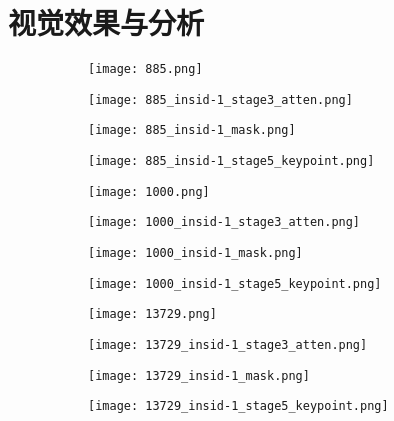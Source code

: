 \section{视觉效果与分析}
\label{sec:demo}

\begin{figure}[htbp]
	\centering
	\begin{minipage}[t]{\linewidth}
		\centering
		\begin{subfigure}[b]{0.23\linewidth}
			\texttt{[image: 885.png]}
		\end{subfigure}
		\begin{subfigure}[b]{0.23\linewidth}
			\texttt{[image: 885\_insid-1\_stage3\_atten.png]}
		\end{subfigure}
		\begin{subfigure}[b]{0.23\linewidth}
			\texttt{[image: 885\_insid-1\_mask.png]}
		\end{subfigure}
		\begin{subfigure}[b]{0.23\linewidth}
			\texttt{[image: 885\_insid-1\_stage5\_keypoint.png]}
		\end{subfigure}
		
		\vskip5pt
		\begin{subfigure}[b]{0.23\linewidth}
			\texttt{[image: 1000.png]}
		\end{subfigure}
		\begin{subfigure}[b]{0.23\linewidth}
			\texttt{[image: 1000\_insid-1\_stage3\_atten.png]}
		\end{subfigure}
		\begin{subfigure}[b]{0.23\linewidth}
			\texttt{[image: 1000\_insid-1\_mask.png]}
		\end{subfigure}
		\begin{subfigure}[b]{0.23\linewidth}
			\texttt{[image: 1000\_insid-1\_stage5\_keypoint.png]}
		\end{subfigure}
		
		\vskip5pt
		\begin{subfigure}[b]{0.23\linewidth}
			\texttt{[image: 13729.png]}
		\end{subfigure}
		\begin{subfigure}[b]{0.23\linewidth}
			\texttt{[image: 13729\_insid-1\_stage3\_atten.png]}
		\end{subfigure}
		\begin{subfigure}[b]{0.23\linewidth}
			\texttt{[image: 13729\_insid-1\_mask.png]}
		\end{subfigure}
		\begin{subfigure}[b]{0.23\linewidth}
			\texttt{[image: 13729\_insid-1\_stage5\_keypoint.png]}
		\end{subfigure}
		

\end{minipage}
\end{figure}
